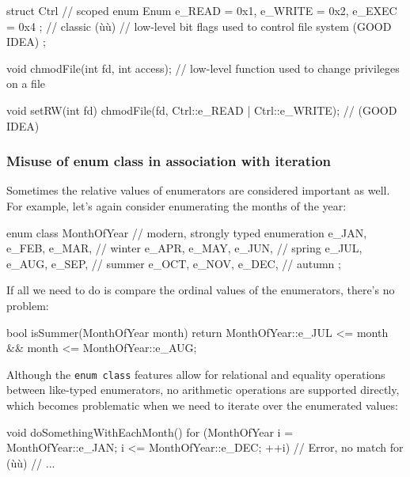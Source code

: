 \begin{emcppslisting}
struct Ctrl // scoped
{
    enum Enum { e_READ = 0x1, e_WRITE = 0x2, e_EXEC = 0x4 };  // classic (ù{}ù)
        // low-level bit flags used to control file system (GOOD IDEA)
};

void chmodFile(int fd, int access);
    // low-level function used to change privileges on a file

void setRW(int fd)
{
    chmodFile(fd, Ctrl::e_READ | Ctrl::e_WRITE);  // (GOOD IDEA)
}
\end{emcppslisting}


\subsubsection[Misuse of {\tt enum} {\tt class} in association with iteration]{Misuse of {\SubsubsecCode enum} {\SubsubsecCode class} in association with iteration}\label{misuse-of-enum-class-in-association-with-iteration}

Sometimes the relative values of enumerators are considered important as
well. For example, let's again consider enumerating the months of the
year:

\begin{emcppslisting}[emcppsbatch={e15,e16}]
enum class MonthOfYear  // modern, strongly typed enumeration
{
    e_JAN, e_FEB, e_MAR,  // winter
    e_APR, e_MAY, e_JUN,  // spring
    e_JUL, e_AUG, e_SEP,  // summer
    e_OCT, e_NOV, e_DEC,  // autumn
};
\end{emcppslisting}

\noindent If all we need to do is compare the ordinal values of the enumerators,
there's no problem:

\begin{emcppslisting}[emcppsbatch=e15]
bool isSummer(MonthOfYear month)
{
    return MonthOfYear::e_JUL <= month && month <= MonthOfYear::e_AUG;
}
\end{emcppslisting}

\noindent Although the \texttt{enum}~\texttt{class} features allow for relational
and equality operations between like-typed enumerators, no arithmetic
operations are supported directly, which becomes problematic when we
need to iterate over the enumerated values:

\begin{emcppslisting}[emcppsbatch=e15,emcppsignore={Entire for block is marked Error}]
void doSomethingWithEachMonth()
{
    for (MonthOfYear i =  MonthOfYear::e_JAN;
                     i <= MonthOfYear::e_DEC;
                   ++i)  // Error, no match for (ù{\codeincomments{++}}ù)
    {
        // ...
    }
}
\end{emcppslisting}

